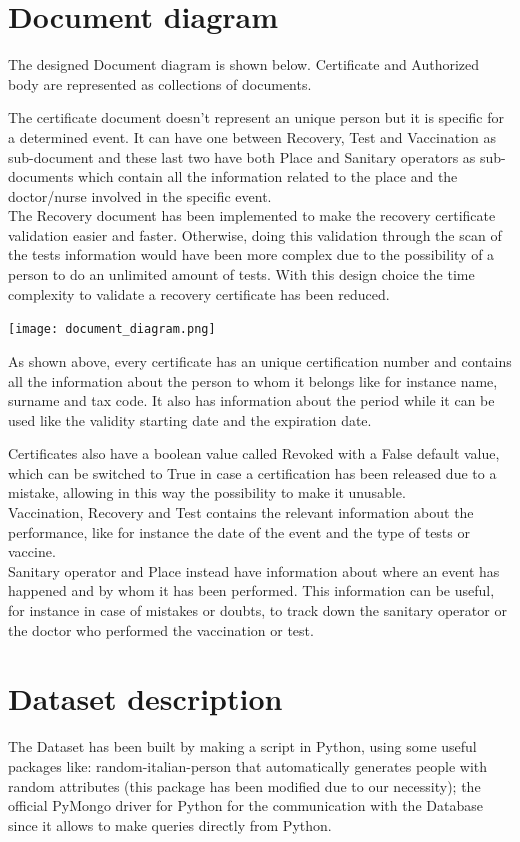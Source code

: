 \documentclass{article}
\begin{document}
\section{Document diagram}
The designed Document diagram is shown below. Certificate and Authorized body are represented as collections of documents.

The certificate document doesn't represent an unique person but it is specific for a determined event. It can have one between Recovery, Test and Vaccination as sub-document and these last two have both Place and Sanitary operators as sub-documents which contain all the information related to the place and the doctor/nurse involved in the specific event.
\hfill\break
\\
The Recovery document has been implemented to make the recovery certificate validation easier and faster. Otherwise, doing this validation through the scan of the tests information would have been more complex due to the possibility of a person to do an unlimited amount of tests.
With this design choice the time complexity to validate a recovery certificate has been reduced.
\hfill\break
\hfill\break


\begin{center}
\texttt{[image: document\_diagram.png]}
\end{center}
As shown above, every certificate has an unique certification number and contains all the information about the person to whom it belongs like for instance name, surname and tax code. It also has information about the period while it can be used like the validity starting date and the expiration date. 

Certificates also have a boolean value called Revoked with a False default value, which can be switched to True in case a certification has been released due to a mistake, allowing in this way the possibility to make it unusable.
\\

Vaccination, Recovery and Test contains the relevant information about the performance, like for instance the date of the event and the type of tests or vaccine.
\\

Sanitary operator and Place instead have information about where an event has happened and by whom it has been performed. This information can be useful, for instance in case of mistakes or doubts, to track down the sanitary operator or the doctor who performed the vaccination or test.

\section{Dataset description}
The Dataset has been built by making a script in Python, using some useful packages like: {\selectfont random-italian-person} that automatically generates people with random attributes (this package has been modified due to our necessity); the official {\selectfont PyMongo} driver for Python for the communication with the Database since it allows to make queries directly from Python.
\end{document}
